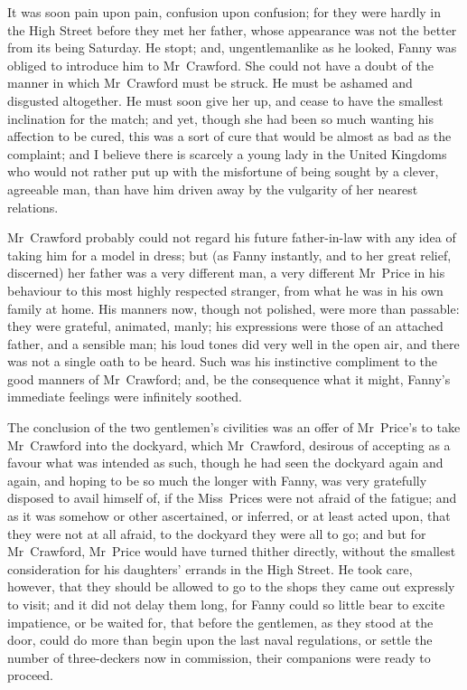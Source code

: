 It was soon pain upon pain, confusion upon confusion; for they were hardly in the High Street before they met her father, whose appearance was not the better from its being Saturday. He stopt; and, ungentlemanlike as he looked, Fanny was obliged to introduce him to Mr~Crawford. She could not have a doubt of the manner in which Mr~Crawford must be struck. He must be ashamed and disgusted altogether. He must soon give her up, and cease to have the smallest inclination for the match; and yet, though she had been so much wanting his affection to be cured, this was a sort of cure that would be almost as bad as the complaint; and I believe there is scarcely a young lady in the United Kingdoms who would not rather put up with the misfortune of being sought by a clever, agreeable man, than have him driven away by the vulgarity of her nearest relations.

Mr~Crawford probably could not regard his future father-in-law with any idea of taking him for a model in dress; but (as Fanny instantly, and to her great relief, discerned) her father was a very different man, a very different Mr~Price in his behaviour to this most highly respected stranger, from what he was in his own family at home. His manners now, though not polished, were more than passable: they were grateful, animated, manly; his expressions were those of an attached father, and a sensible man; his loud tones did very well in the open air, and there was not a single oath to be heard. Such was his instinctive compliment to the good manners of Mr~Crawford; and, be the consequence what it might, Fanny's immediate feelings were infinitely soothed.

The conclusion of the two gentlemen's civilities was an offer of Mr~Price's to take Mr~Crawford into the dockyard, which Mr~Crawford, desirous of accepting as a favour what was intended as such, though he had seen the dockyard again and again, and hoping to be so much the longer with Fanny, was very gratefully disposed to avail himself of, if the Miss~Prices were not afraid of the fatigue; and as it was somehow or other ascertained, or inferred, or at least acted upon, that they were not at all afraid, to the dockyard they were all to go; and but for Mr~Crawford, Mr~Price would have turned thither directly, without the smallest consideration for his daughters' errands in the High Street. He took care, however, that they should be allowed to go to the shops they came out expressly to visit; and it did not delay them long, for Fanny could so little bear to excite impatience, or be waited for, that before the gentlemen, as they stood at the door, could do more than begin upon the last naval regulations, or settle the number of three-deckers now in commission, their companions were ready to proceed.

